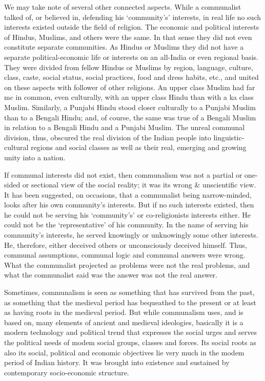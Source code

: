 We may take note of several other connected aspects. While a communalist talked of, or believed in, defending his `community's' interests, in real life no such interests existed outside the field of religion. The economic and political interests of Hindus, Muslims, and others were the same. In that sense they did not even constitute separate communities. As Hindus or Muslims they did not have a separate political-economic life or interests on an all-India or even regional basis. They were divided from fellow Hindus or Muslims by region, language, culture, class, caste, social status, social practices, food and dress habits, etc., and united on these aspects with follower of other religions. An upper class Muslim had far mc in common, even culturally, with an upper class Hindu than with a ka class Muslim. Similarly, a Punjabi Hindu stood closer culturally to a Punjabi Muslim than to a Bengali Hindu; and, of course, the same was true of a Bengali Muslim in relation to a Bengali Hindu and a Punjabi Muslim. The unreal communal division, thus, obscured the real division of the Indian people into linguistic-cultural regions and social classes as well as their real, emerging and growing unity into a nation. 

If communal interests did not exist, then communalism was not a partial or one-sided or sectional view of the social reality; it was its wrong \& unscientific view. It has been suggested, on occasions, that a communalist being narrow-minded, looks after his own community's interests. But if no such interests existed, then he could not be serving his `community's' or co-religionists interests either. He could not be the `representative' of his community. In the name of serving his community's interests, he served knowingly or unknowingly some other interests. He, therefore, either deceived others or unconsciously deceived himself. Thus, communal assumptions, communal logic and communal answers were wrong. What the communalist projected as problems were not the real problems, and what the communalist said was the answer was not the real answer. 

Sometimes, communalism is seen as something that has survived from the past, as something that the medieval period has bequeathed to the present or at least as having roots in the medieval period. But while communalism uses, and is based on, many elements of ancient and medieval ideologies, basically it is a modern technology and political trend that expresses the social urges and serves the political needs of modem social groups, classes and forces. Its social roots as also its social, political and economic objectives lie very much in the modem period of Indian history. It was brought into existence and sustained by contemporary socio-economic structure. 

